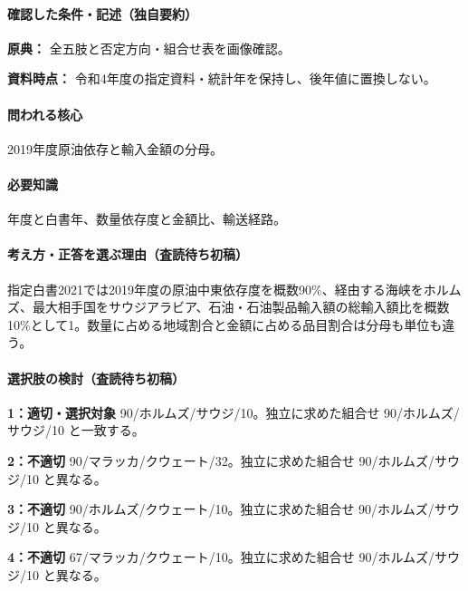\paragraph{確認した条件・記述（独自要約）}\mbox{}\par

\noindent\textbf{原典：} 全五肢と否定方向・組合せ表を画像確認。\par

\noindent\textbf{資料時点：} 令和4年度の指定資料・統計年を保持し、後年値に置換しない。\par

\paragraph{問われる核心} 2019年度原油依存と輸入金額の分母。

\paragraph{必要知識} 年度と白書年、数量依存度と金額比、輸送経路。

\paragraph{考え方・正答を選ぶ理由（査読待ち初稿）} 指定白書2021では2019年度の原油中東依存度を概数90\%、経由する海峡をホルムズ、最大相手国をサウジアラビア、石油・石油製品輸入額の総輸入額比を概数10\%として1。数量に占める地域割合と金額に占める品目割合は分母も単位も違う。

\paragraph{選択肢の検討（査読待ち初稿）}\mbox{}\par

\noindent\textbf{1：適切・選択対象} 90/ホルムズ/サウジ/10。独立に求めた組合せ 90/ホルムズ/サウジ/10 と一致する。\par

\noindent\textbf{2：不適切} 90/マラッカ/クウェート/32。独立に求めた組合せ 90/ホルムズ/サウジ/10 と異なる。\par

\noindent\textbf{3：不適切} 90/ホルムズ/クウェート/10。独立に求めた組合せ 90/ホルムズ/サウジ/10 と異なる。\par

\noindent\textbf{4：不適切} 67/マラッカ/クウェート/10。独立に求めた組合せ 90/ホルムズ/サウジ/10 と異なる。\par

